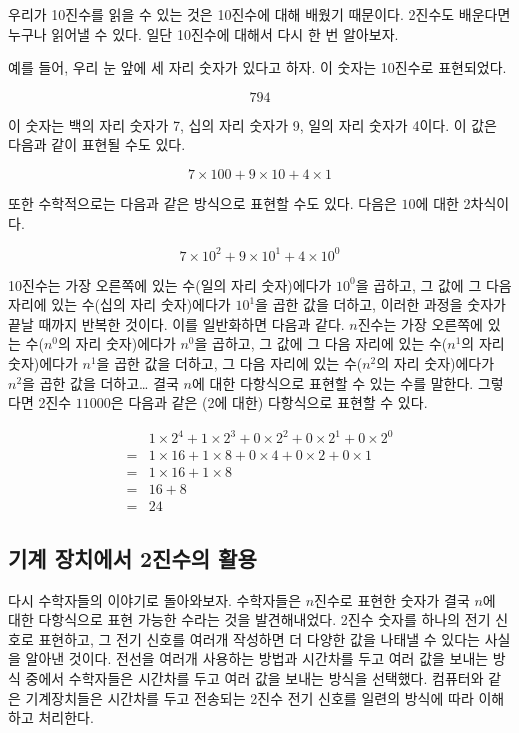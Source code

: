 \documentclass{article}
\begin{document}
우리가 10진수를 읽을 수 있는 것은 10진수에 대해 배웠기 때문이다. 2진수도 배운다면
누구나 읽어낼 수 있다. 일단 10진수에 대해서 다시 한 번 알아보자.

예를 들어, 우리 눈 앞에 세 자리 숫자가 있다고 하자. 이 숫자는 10진수로 표현되었다.

$$
794
$$

이 숫자는 백의 자리 숫자가 7, 십의 자리 숫자가 9, 일의 자리 숫자가 4이다.
이 값은 다음과 같이 표현될 수도 있다.

$$
7 \times 100 + 9 \times 10 + 4 \times 1
$$

또한 수학적으로는 다음과 같은 방식으로 표현할 수도 있다. 다음은 $10$에 대한
2차식이다.

$$
7 \times 10^2 + 9 \times 10^1 + 4 \times 10^0
$$

10진수는 가장 오른쪽에 있는 수(일의 자리 숫자)에다가 $10^0$을 곱하고, 그 값에
그 다음 자리에 있는 수(십의 자리 숫자)에다가 $10^1$을 곱한 값을 더하고,
이러한 과정을 숫자가 끝날 때까지 반복한 것이다. 이를 일반화하면 다음과 같다.
$n$진수는 가장 오른쪽에 있는 수($n^0$의 자리 숫자)에다가 $n^0$을 곱하고, 그 값에
그 다음 자리에 있는 수($n^1$의 자리 숫자)에다가 $n^1$을 곱한 값을 더하고,
그 다음 자리에 있는 수($n^2$의 자리 숫자)에다가 $n^2$을 곱한 값을 더하고\dots
결국 $n$에 대한 다항식으로 표현할 수 있는 수를 말한다.
그렇다면 2진수 $11000$은 다음과 같은 (2에 대한) 다항식으로 표현할 수 있다.

$$
\begin{aligned}
     & 1 \times 2^4 + 1 \times 2^3 + 0 \times 2^2 + 0 \times 2^1 + 0 \times 2^0 \\
    =& 1 \times 16 + 1 \times 8 + 0 \times 4 + 0 \times 2 + 0 \times 1 \\
    =& 1 \times 16 + 1 \times 8 \\
    =& 16 + 8 \\
    =& 24
\end{aligned}
$$

\subsection{기계 장치에서 2진수의 활용}

다시 수학자들의 이야기로 돌아와보자. 수학자들은 $n$진수로 표현한 숫자가 결국
$n$에 대한 다항식으로 표현 가능한 수라는 것을 발견해내었다. 2진수 숫자를 하나의
전기 신호로 표현하고, 그 전기 신호를 여러개 작성하면 더 다양한 값을 나태낼 수 있다는
사실을 알아낸 것이다. 전선을 여러개 사용하는 방법과 시간차를 두고 여러 값을 보내는
방식 중에서 수학자들은 시간차를 두고 여러 값을 보내는 방식을 선택했다. 컴퓨터와 같은
기계장치들은 시간차를 두고 전송되는 2진수 전기 신호를 일련의 방식에 따라 이해하고 처리한다.
\end{document}
